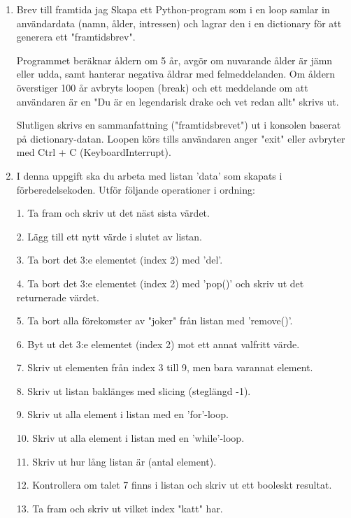 \documentclass[11pt,a4paper]{article}
\begin{document}
\begin{enumerate}
\begin{lstlisting}
        print(text)
        print(type(text), type(x), type(f), type(c), type(l), type(t))

        help(int)
        help(None)
    \end{lstlisting}
    \item Brev till framtida jag
        Skapa ett Python-program som i en loop samlar in användardata (namn, ålder, intressen) och lagrar den i en dictionary för att generera ett "framtidsbrev". 
        

        Programmet beräknar åldern om 5 år, avgör om nuvarande ålder är jämn eller udda, samt hanterar negativa åldrar med felmeddelanden. Om åldern överstiger 100 år avbryts loopen (break) och ett meddelande om att användaren är en "Du är en legendarisk drake och vet redan allt" skrivs ut.


        Slutligen skrivs en sammanfattning ("framtidsbrevet") ut i konsolen baserat på dictionary-datan. Loopen körs tills användaren anger "exit" eller avbryter med Ctrl + C (KeyboardInterrupt).
    \item I denna uppgift ska du arbeta med listan 'data' som skapats i förberedelsekoden. 
    Utför följande operationer i ordning:


    1. Ta fram och skriv ut det näst sista värdet.

    2. Lägg till ett nytt värde i slutet av listan.

    3. Ta bort det 3:e elementet (index 2) med 'del'.
    
    4. Ta bort det 3:e elementet (index 2) med 'pop()' och skriv ut det returnerade värdet.
    
    5. Ta bort alla förekomster av "joker" från listan med 'remove()'.
    
    6. Byt ut det 3:e elementet (index 2) mot ett annat valfritt värde.
    
    7. Skriv ut elementen från index 3 till 9, men bara varannat element.
    
    8. Skriv ut listan baklänges med slicing (steglängd -1).
    
    9. Skriv ut alla element i listan med en 'for'-loop.
    
    10. Skriv ut alla element i listan med en 'while'-loop.
    
    11. Skriv ut hur lång listan är (antal element).
    
    12. Kontrollera om talet 7 finns i listan och skriv ut ett booleskt resultat.
    
    13. Ta fram och skriv ut vilket index "katt" har.
    

\end{enumerate}
\end{document}
